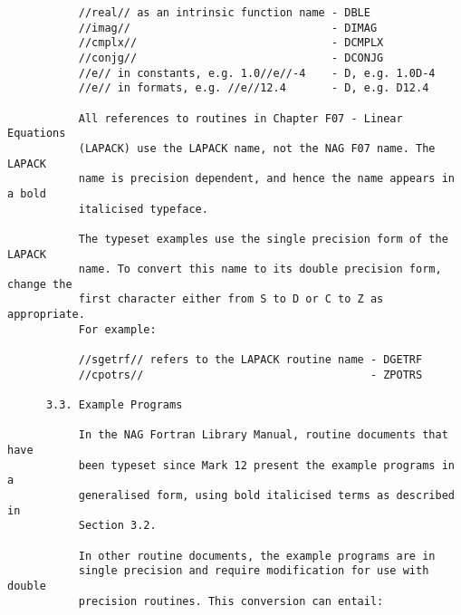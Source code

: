\begin{small}
\begin{verbatim}
           //real// as an intrinsic function name - DBLE                        
           //imag//                               - DIMAG                       
           //cmplx//                              - DCMPLX                      
           //conjg//                              - DCONJG                      
           //e// in constants, e.g. 1.0//e//-4    - D, e.g. 1.0D-4              
           //e// in formats, e.g. //e//12.4       - D, e.g. D12.4               
                                                                                
           All references to routines in Chapter F07 - Linear Equations         
           (LAPACK) use the LAPACK name, not the NAG F07 name. The LAPACK       
           name is precision dependent, and hence the name appears in a bold    
           italicised typeface.                                                 
                                                                                
           The typeset examples use the single precision form of the LAPACK     
           name. To convert this name to its double precision form, change the  
           first character either from S to D or C to Z as appropriate.         
           For example:                                                         
                                                                                
           //sgetrf// refers to the LAPACK routine name - DGETRF                
           //cpotrs//                                   - ZPOTRS                
                                                                                
      3.3. Example Programs                                                     
                                                                                
           In the NAG Fortran Library Manual, routine documents that have       
           been typeset since Mark 12 present the example programs in a         
           generalised form, using bold italicised terms as described in        
           Section 3.2.                                                         
                                                                                
           In other routine documents, the example programs are in              
           single precision and require modification for use with double        
           precision routines. This conversion can entail:                      
                                                                                

\end{verbatim}
\end{small}
